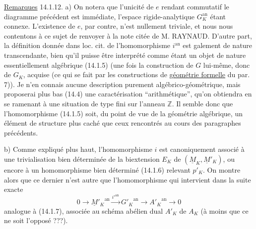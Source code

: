\uline{Remarques} 14.1.12. \quad a) On notera que l'unicité de $e$ rendant commutatif le diagramme précédent est immédiate, l'espace rigide-analytique $G_K^{\mathrm{an}}$ étant connexe. L'existence de $e$, par contre, n'est nullement triviale, et nous nous contentons à ce sujet de renvoyer à la note citée de M. RAYNAUD. D'autre part, la définition donnée dans loc. cit. de l'homomorphisme $i^{\mathrm{an}}$ est galement de nature transcendante, bien qu'il puisse être interprété comme étant un objet de nature essentiellement algébrique (14.1.5) (une fois la construction de $G$ lui-même, donc de $G_K$, acquise (ce qui se fait par les constructions de \uline{géométrie formelle} du par. 7)). Je n'en connais aucune description purement algébrico-géométrique, mais proposerai plus bas (14.4) une caractérisation ``arithmétique'', qu'on obtiendra en se ramenant à une situation de type fini sur l'anneau $\mathbb Z$. Il semble donc que l'homomorphisme (14.1.5) soit, du point de vue de la géométrie algébrique, un élément de structure plus caché que ceux rencontrés au cours des paragraphes précédents.

b) Comme expliqué plus haut, l'homomorphisme $i$ est canoniquement associé à une trivialisation bien déterminée de la biextension $E_K$ de $(\underline M_K,\underline M'_K)$, ou encore à un homomorphisme bien déterminé (14.1.6) relevant $p'_K$. On montre alors que ce dernier n'est autre que l'homomorphisme qui intervient dans la suite exacte
\[
 0\longrightarrow{\underline M'_K}^{\mathrm{an}}\xrightarrow{{i'}^{\mathrm{an}}}{G'_K}^{\mathrm{an}}
 \longrightarrow {A'_K}^{\mathrm{an}}\longrightarrow0 \tag*{(14.1.13)}
\]
analogue à (14.1.7), associée au schéma abélien dual $A'_K$ de $A_K$ (à moins que ce ne soit l'opposé ???).


\handwritten{$\unsure{\Omega}$}


